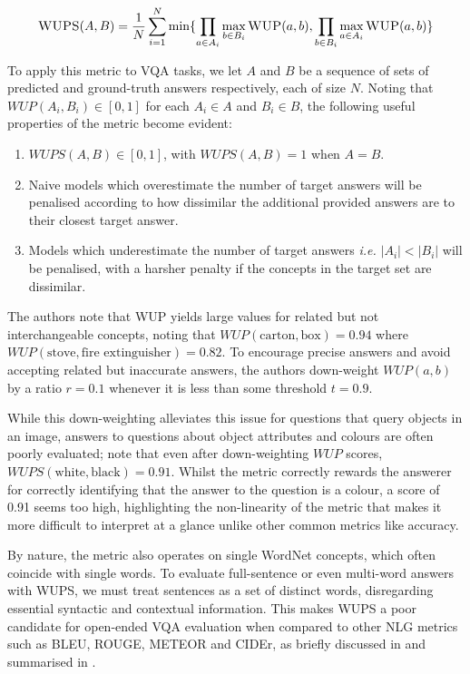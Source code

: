 \begin{equation}
    \textsc{WUPS}(A, B) = \frac{1}{N} \sum_{i=1}^N \min \{\prod_{a \in A_i} \max_{b \in B_i} \textsc{WUP}(a, b), \prod_{b \in B_i} \max_{a \in A_i} \textsc{WUP}(a, b)\}
    \label{equation:wups}
\end{equation}

To apply this metric to VQA tasks, we let \(A\) and \(B\) be a sequence of sets of predicted and ground-truth answers respectively, each of size \(N\). Noting that \(WUP(A_i, B_i) \in [0, 1]\) for each \(A_i \in A\) and \(B_i \in B\), the following useful properties of the metric become evident:

\begin{enumerate}
    \item \(WUPS(A, B) \in [0, 1]\), with \(WUPS(A, B) = 1\) when \(A = B\).
    \item Naive models which overestimate the number of target answers will be penalised according to how dissimilar the additional provided answers are to their closest target answer.
    \item Models which underestimate the number of target answers \textit{i.e.} \(|A_i| < |B_i|\) will be penalised, with a harsher penalty if the concepts in the target set are dissimilar.
\end{enumerate}

The authors note that WUP yields large values for related but not interchangeable concepts, noting that \(WUP(\text{carton}, \text{box}) = 0.94\) where \(WUP(\text{stove}, \text{fire extinguisher}) = 0.82\). To encourage precise answers and avoid accepting related but inaccurate answers, the authors down-weight \(WUP(a, b)\) by a ratio \(r = 0.1\) whenever it is less than some threshold \(t = 0.9\).

While this down-weighting alleviates this issue for questions that query objects in an image, answers to questions about object attributes and colours are often poorly evaluated; \citeauthor{kafle2017visual} note that even after down-weighting \(WUP\) scores, \(WUPS(\text{white}, \text{black}) = 0.91\). Whilst the metric correctly rewards the answerer for correctly identifying that the answer to the question is a colour, a score of 0.91 seems too high, highlighting the non-linearity of the metric that makes it more difficult to interpret at a glance unlike other common metrics like accuracy.

By nature, the metric also operates on single WordNet concepts, which often coincide with single words. To evaluate full-sentence or even multi-word answers with WUPS, we must treat sentences as a set of distinct words, disregarding essential syntactic and contextual information. This makes WUPS a poor candidate for open-ended VQA evaluation when compared to other NLG metrics such as BLEU, ROUGE, METEOR and CIDEr, as briefly discussed in \subsectionautorefname{ \ref{subsection:open_ended_vqa_metrics}} and summarised in \tableautorefname{ \ref{tab:vqa_metrics_comparison}}.

